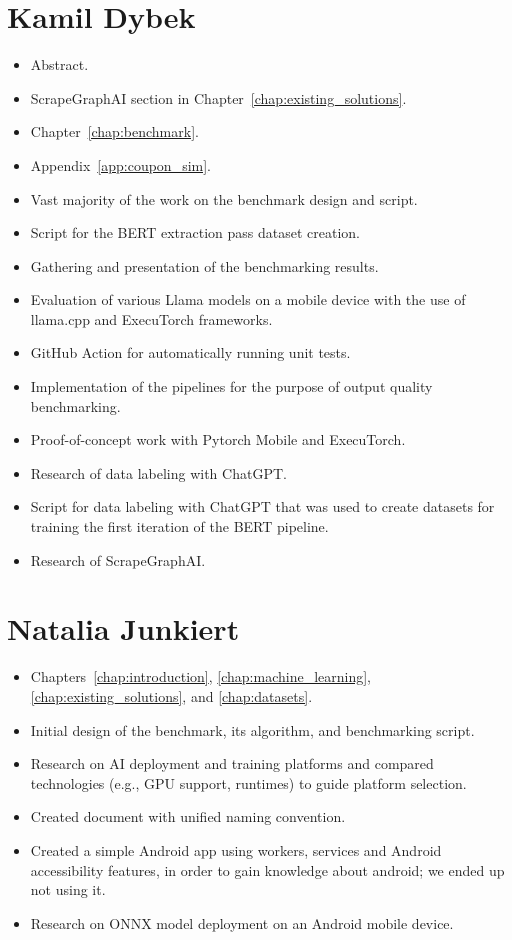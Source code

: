 \documentclass[licencjacka,en]{pracamgr}
\begin{document}
\section{Kamil Dybek}
\begin{itemize}
    \item Abstract.
    \item ScrapeGraphAI section in Chapter~\ref{chap:existing_solutions}.
    \item Chapter~\ref{chap:benchmark}.
    \item Appendix~\ref{app:coupon_sim}.
    \item Vast majority of the work on the benchmark design and script.
    \item Script for the BERT extraction pass dataset creation.
    \item Gathering and presentation of the benchmarking results.
    \item Evaluation of various Llama models on a mobile device with the use of llama.cpp and ExecuTorch frameworks.
    \item GitHub Action for automatically running unit tests.
    \item Implementation of the pipelines for the purpose of output quality benchmarking.
    \item Proof-of-concept work with Pytorch Mobile and ExecuTorch.
    \item Research of data labeling with ChatGPT.
    \item Script for data labeling with ChatGPT that was used to create datasets for training the first iteration of the BERT pipeline.
    \item Research of ScrapeGraphAI.

\end{itemize}

\section{Natalia Junkiert}
\begin{itemize}
   \item Chapters~\ref{chap:introduction}, \ref{chap:machine_learning}, \ref{chap:existing_solutions}, and \ref{chap:datasets}.
    \item Initial design of the benchmark, its algorithm, and benchmarking script.
    \item Research on AI deployment and training platforms and compared technologies (e.g., GPU support, runtimes) to guide platform selection.
    \item Created document with unified naming convention.
    \item Created a simple Android app using workers, services and Android accessibility features, in order to gain knowledge about android; we ended up not using it.
    \item Research on ONNX model deployment on an Android mobile device.
\end{itemize}
\end{document}

